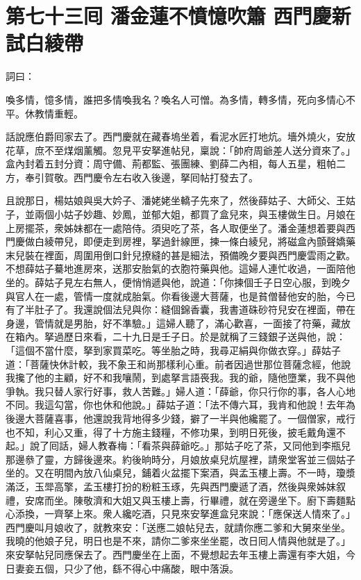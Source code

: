 
\chapter*{第七十三囘 潘金蓮不憤憶吹簫 西門慶新試白綾帶}


詞曰：

\begin{myquote}
喚多情，憶多情，誰把多情喚我名？喚名人可憎。為多情，轉多情，死向多情心不平。休教情重輕。

\end{myquote}

話說應伯爵囘家去了。西門慶就在藏春塢坐着，看泥水匠打地炕。墻外燒火，安放花草，庶不至煤烟薰觸。忽見平安拏進帖兒，稟說：「帥府周爺差人送分資來了。」盒內封着五封分資：周守備、荊都監、張團練、劉薛二內相，每人五星，粗帕二方，奉引賀敬。西門慶令左右收入後邊，拏囘帖打發去了。

且說那日，楊姑娘與吳大妗子、潘姥姥坐轎子先來了，然後薛姑子、大師父、王姑子，並兩個小姑子妙趣、妙鳳，並郁大姐，都買了盒兒來，與玉樓做生日。月娘在上房擺茶，衆姊妹都在一處陪侍。須臾吃了茶，各人取便坐了。潘金蓮想着要與西門慶做白綾帶兒，即便走到房裡，拏過針線匣，揀一條白綾兒，將磁盒內顫聲嬌藥末兒裝在裡面，周圍用倒口針兒撩縫的甚是細法，預備晚夕要與西門慶雲雨之歡。不想薛姑子驀地進房來，送那安胎氣的衣胞符藥與他。這婦人連忙收過，一面陪他坐的。薛姑子見左右無人，便悄悄遞與他，{}說道：「你揀個壬子日空心服，到晚夕與官人在一處，管情一度就成胎氣。你看後邊大菩薩，也是貧僧替他安的胎，今已有了半肚子了。我還說個法兒與你：縫個錦香囊，我書道硃砂符兒安在裡面，帶在身邊，管情就是男胎，好不準驗。」{}這婦人聽了，滿心歡喜，一面接了符藥，藏放在箱內。拏過歷日來看，二十九日是壬子日。於是就稱了三錢銀子送與他，說：「這個不當什麼，拏到家買菜吃。等坐胎之時，我尋疋絹與你做衣穿。」薛姑子道：「菩薩快休計較，我不象王和尚那樣利心重。{}前者因過世那位菩薩念經，他說我攙了他的主顧，好不和我嚷鬧，到處拏言語䘮我。我的爺，隨他墮業，我不與他爭執。我只替人家行好事，救人苦難。」婦人道：「薛爺，你只行你的事，各人心地不同。我這勾當，你也休和他說。」薛姑子道：「法不傳六耳，我肯和他說！去年為後邊大菩薩喜事，他還說我背地得多少錢，擗了一半與他纔罷了。一個僧家，戒行也不知，利心又重，得了十方施主錢糧，不修功果，到明日死後，披毛戴角還不起。」說了囘話，婦人教春梅：「看茶與薛爺吃。」那姑子吃了茶，又同他到李瓶兒那邊叅了靈，方歸後邊來。約後晌時分，月娘放桌兒炕屋裡，請衆堂客並三個姑子坐的。又在明間內放八仙桌兒，鋪着火盆擺下案酒，與孟玉樓上壽。不一時，瓊漿滿泛，玉斝高擎，孟玉樓打扮的粉粧玉琢，先與西門慶遞了酒，然後與衆姊妹叙禮，安席而坐。陳敬濟和大姐又與玉樓上壽，行畢禮，就在旁邊坐下。廚下壽麵點心添換，一齊拏上來。衆人纔吃酒，只見來安拏進盒兒來說：「應保送人情來了。」西門慶叫月娘收了，就教來安：「送應二娘帖兒去，就請你應二爹和大舅來坐坐。我曉的他娘子兒，明日也是不來，請你二爹來坐坐罷，改日囘人情與他就是了。」來安拏帖兒同應保去了。西門慶坐在上面，不覺想起去年玉樓上壽還有李大姐，今日妻妾五個，只少了他，繇不得心中痛酸，眼中落淚。{}

